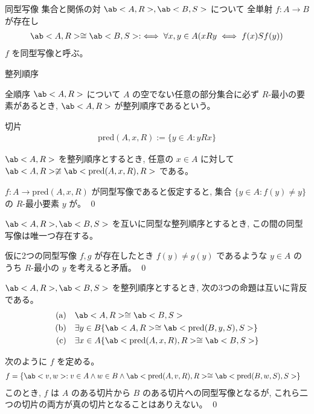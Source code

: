\documentclass[uplatex,dvipdfmx,a4paper,11pt]{jlreq}
\makeatletter
\theoremstyle{definition}
\renewenvironment{proof}[1][\proofname]{\par
  \normalfont
  \topsep6\p@\@plus6\p@ \trivlist
  \item[\hskip\labelsep{\bfseries #1}\@addpunct{\bfseries}]\ignorespaces\quad\par
}{%
  \qed\endtrivlist\@endpefalse
}
\renewcommand\proofname{証明}
\makeatother
\begin{document}
\begin{definition}
  同型写像
  集合と関係の対 $\ab<A, R>, \ab<B, S>$ について
  全単射 $f:A\to B$ が存在し
  \begin{align}
    \ab<A,R>\cong\ab<B,S>:\iff \forall x,y\in A(xRy\iff f(x)Sf(y))
  \end{align}
  $f$ を同型写像と呼ぶ。

  整列順序

  全順序 $\ab<A,R>$ について $A$ の空でない任意の部分集合に必ず $R$-最小の要素があるとき, $\ab<A,R>$ が整列順序であるという。

  切片
  \begin{align}
    \mathrm{pred}(A,x,R) := \{y\in A:yRx\}
  \end{align}
\end{definition}

\begin{theorem}
  $\ab<A,R>$ を整列順序とするとき, 任意の $x\in A$ に対して $\ab<A,R>\ncong\ab<\mathrm{pred}(A,x,R), R>$ である。
\end{theorem}
\begin{proof}
  $f:A\to\mathrm{pred}(A,x,R)$ が同型写像であると仮定すると, 集合 $\{y\in A:f(y)\neq y\}$ の $R$-最小要素 $y$ が。
\end{proof}

\begin{theorem}
  $\ab<A,R>, \ab<B,S>$ を互いに同型な整列順序とするとき, この間の同型写像は唯一つ存在する。
\end{theorem}
\begin{proof}
  仮に2つの同型写像 $f, g$ が存在したとき $f(y)\neq g(y)$ であるような $y\in A$ のうち $R$-最小の $y$ を考えると矛盾。
\end{proof}

\begin{theorem}
  $\ab<A,R>, \ab<B,S>$ を整列順序とするとき, 次の3つの命題は互いに背反である。
  \begin{align}
    \text{(a)}\quad & \ab<A,R>\cong\ab<B,S>                                      \\
    \text{(b)}\quad & \exists y\in B\{\ab<A,R>\cong\ab<\mathrm{pred}(B,y,S),S>\} \\
    \text{(c)}\quad & \exists x\in A\{\ab<\mathrm{pred}(A,x,R),R>\cong\ab<B,S>\}
  \end{align}
\end{theorem}
\begin{proof}
  次のように $f$ を定める。
  \begin{align}
    f & = \{\ab<v, w>: v\in A\land w\in B\land\ab<\mathrm{pred}(A,v,R), R>\cong\ab<\mathrm{pred}(B,w,S),S>\}
  \end{align}
  このとき, $f$ は $A$ のある切片から $B$ のある切片への同型写像となるが, これら二つの切片の両方が真の切片となることはありえない。
\end{proof}
\end{document}
